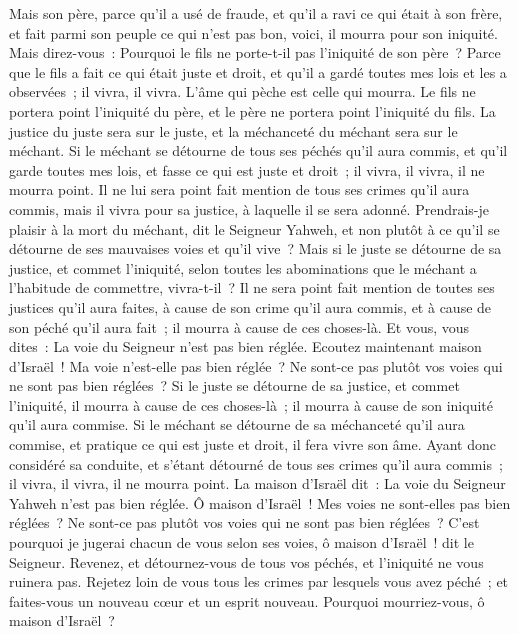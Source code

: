\begin{multicols}{2}
Mais son père, parce qu'il a usé de fraude, et qu'il a ravi ce qui était à son frère, et fait parmi son peuple ce qui n'est pas bon, voici, il mourra pour son iniquité.
Mais direz-vous~: Pourquoi le fils ne porte-t-il pas l'iniquité de son père~? Parce que le fils a fait ce qui était juste et droit, et qu'il a gardé toutes mes lois et les a observées~; il vivra, il vivra.
L'âme qui pèche est celle qui mourra. Le fils ne portera point l'iniquité du père, et le père ne portera point l'iniquité du fils. La justice du juste sera sur le juste, et la méchanceté du méchant sera sur le méchant.
Si le méchant se détourne de tous ses péchés qu'il aura commis, et qu'il garde toutes mes lois, et fasse ce qui est juste et droit~; il vivra, il vivra, il ne mourra point.
Il ne lui sera point fait mention de tous ses crimes qu'il aura commis, mais il vivra pour sa justice, à laquelle il se sera adonné.
Prendrais-je plaisir à la mort du méchant, dit le Seigneur Yahweh, et non plutôt à ce qu'il se détourne de ses mauvaises voies et qu'il vive~?
Mais si le juste se détourne de sa justice, et commet l'iniquité, selon toutes les abominations que le méchant a l'habitude de commettre, vivra-t-il~? Il ne sera point fait mention de toutes ses justices qu'il aura faites, à cause de son crime qu'il aura commis, et à cause de son péché qu'il aura fait~; il mourra à cause de ces choses-là.
Et vous, vous dites~: La voie du Seigneur n'est pas bien réglée. Ecoutez maintenant maison d'Israël~! Ma voie n'est-elle pas bien réglée~? Ne sont-ce pas plutôt vos voies qui ne sont pas bien réglées~?
Si le juste se détourne de sa justice, et commet l'iniquité, il mourra à cause de ces choses-là~; il mourra à cause de son iniquité qu'il aura commise.
Si le méchant se détourne de sa méchanceté qu'il aura commise, et pratique ce qui est juste et droit, il fera vivre son âme.
Ayant donc considéré sa conduite, et s'étant détourné de tous ses crimes qu'il aura commis~; il vivra, il vivra, il ne mourra point.
La maison d'Israël dit~: La voie du Seigneur Yahweh n'est pas bien réglée. Ô maison d'Israël~! Mes voies ne sont-elles pas bien réglées~? Ne sont-ce pas plutôt vos voies qui ne sont pas bien réglées~?
C'est pourquoi je jugerai chacun de vous selon ses voies, ô maison d'Israël~! dit le Seigneur. Revenez, et détournez-vous de tous vos péchés, et l'iniquité ne vous ruinera pas.
Rejetez loin de vous tous les crimes par lesquels vous avez péché~; et faites-vous un nouveau cœur et un esprit nouveau. Pourquoi mourriez-vous, ô maison d'Israël~?

\end{multicols}
